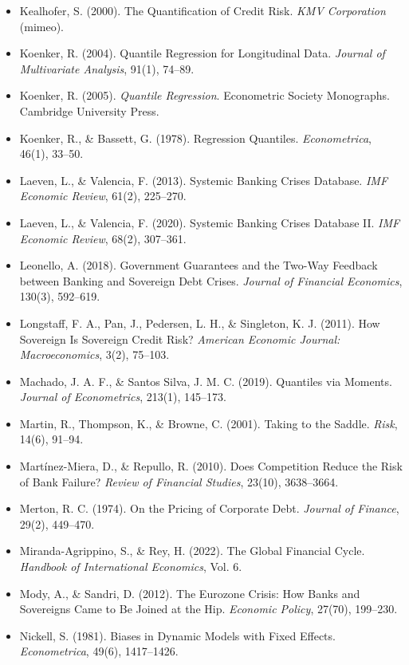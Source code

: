 \documentclass[5p,times,twocolumn,authoryear]{elsarticle}
\begin{document}
\begin{itemize}
    \item Kealhofer, S. (2000). The Quantification of Credit Risk. \textit{KMV Corporation} (mimeo).
    \item Koenker, R. (2004). Quantile Regression for Longitudinal Data. \textit{Journal of Multivariate Analysis}, 91(1), 74–89.
    \item Koenker, R. (2005). \textit{Quantile Regression}. Econometric Society Monographs. Cambridge University Press.
    \item Koenker, R., \& Bassett, G. (1978). Regression Quantiles. \textit{Econometrica}, 46(1), 33–50.
    \item Laeven, L., \& Valencia, F. (2013). Systemic Banking Crises Database. \textit{IMF Economic Review}, 61(2), 225–270.
    \item Laeven, L., \& Valencia, F. (2020). Systemic Banking Crises Database II. \textit{IMF Economic Review}, 68(2), 307–361.
    \item Leonello, A. (2018). Government Guarantees and the Two-Way Feedback between Banking and Sovereign Debt Crises. \textit{Journal of Financial Economics}, 130(3), 592–619.
    \item Longstaff, F. A., Pan, J., Pedersen, L. H., \& Singleton, K. J. (2011). How Sovereign Is Sovereign Credit Risk? \textit{American Economic Journal: Macroeconomics}, 3(2), 75–103.
    \item Machado, J. A. F., \& Santos Silva, J. M. C. (2019). Quantiles via Moments. \textit{Journal of Econometrics}, 213(1), 145–173.
    \item Martin, R., Thompson, K., \& Browne, C. (2001). Taking to the Saddle. \textit{Risk}, 14(6), 91–94.
    \item Martínez-Miera, D., \& Repullo, R. (2010). Does Competition Reduce the Risk of Bank Failure? \textit{Review of Financial Studies}, 23(10), 3638–3664.
    \item Merton, R. C. (1974). On the Pricing of Corporate Debt. \textit{Journal of Finance}, 29(2), 449–470.
    \item Miranda-Agrippino, S., \& Rey, H. (2022). The Global Financial Cycle. \textit{Handbook of International Economics}, Vol. 6.
    \item Mody, A., \& Sandri, D. (2012). The Eurozone Crisis: How Banks and Sovereigns Came to Be Joined at the Hip. \textit{Economic Policy}, 27(70), 199–230.
    \item Nickell, S. (1981). Biases in Dynamic Models with Fixed Effects. \textit{Econometrica}, 49(6), 1417–1426.

\end{itemize}
\end{document}
